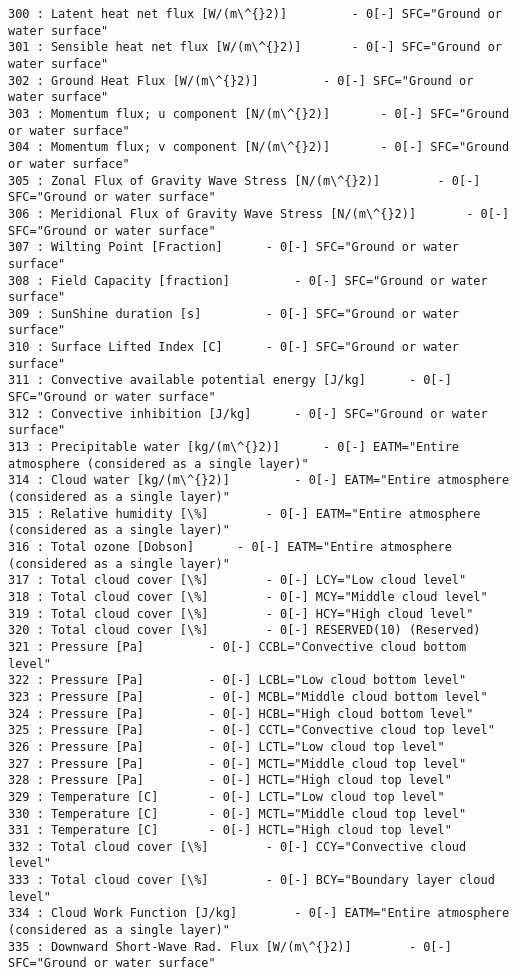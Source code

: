 \documentclass[11pt]{article}
\begin{document}
\begin{Verbatim}[commandchars=\\\{\}]
300 : Latent heat net flux [W/(m\^{}2)] 		- 0[-] SFC="Ground or water surface"
301 : Sensible heat net flux [W/(m\^{}2)] 		- 0[-] SFC="Ground or water surface"
302 : Ground Heat Flux [W/(m\^{}2)] 		- 0[-] SFC="Ground or water surface"
303 : Momentum flux; u component [N/(m\^{}2)] 		- 0[-] SFC="Ground or water surface"
304 : Momentum flux; v component [N/(m\^{}2)] 		- 0[-] SFC="Ground or water surface"
305 : Zonal Flux of Gravity Wave Stress [N/(m\^{}2)] 		- 0[-] SFC="Ground or water surface"
306 : Meridional Flux of Gravity Wave Stress [N/(m\^{}2)] 		- 0[-] SFC="Ground or water surface"
307 : Wilting Point [Fraction] 		- 0[-] SFC="Ground or water surface"
308 : Field Capacity [fraction] 		- 0[-] SFC="Ground or water surface"
309 : SunShine duration [s] 		- 0[-] SFC="Ground or water surface"
310 : Surface Lifted Index [C] 		- 0[-] SFC="Ground or water surface"
311 : Convective available potential energy [J/kg] 		- 0[-] SFC="Ground or water surface"
312 : Convective inhibition [J/kg] 		- 0[-] SFC="Ground or water surface"
313 : Precipitable water [kg/(m\^{}2)] 		- 0[-] EATM="Entire atmosphere (considered as a single layer)"
314 : Cloud water [kg/(m\^{}2)] 		- 0[-] EATM="Entire atmosphere (considered as a single layer)"
315 : Relative humidity [\%] 		- 0[-] EATM="Entire atmosphere (considered as a single layer)"
316 : Total ozone [Dobson] 		- 0[-] EATM="Entire atmosphere (considered as a single layer)"
317 : Total cloud cover [\%] 		- 0[-] LCY="Low cloud level"
318 : Total cloud cover [\%] 		- 0[-] MCY="Middle cloud level"
319 : Total cloud cover [\%] 		- 0[-] HCY="High cloud level"
320 : Total cloud cover [\%] 		- 0[-] RESERVED(10) (Reserved)
321 : Pressure [Pa] 		- 0[-] CCBL="Convective cloud bottom level"
322 : Pressure [Pa] 		- 0[-] LCBL="Low cloud bottom level"
323 : Pressure [Pa] 		- 0[-] MCBL="Middle cloud bottom level"
324 : Pressure [Pa] 		- 0[-] HCBL="High cloud bottom level"
325 : Pressure [Pa] 		- 0[-] CCTL="Convective cloud top level"
326 : Pressure [Pa] 		- 0[-] LCTL="Low cloud top level"
327 : Pressure [Pa] 		- 0[-] MCTL="Middle cloud top level"
328 : Pressure [Pa] 		- 0[-] HCTL="High cloud top level"
329 : Temperature [C] 		- 0[-] LCTL="Low cloud top level"
330 : Temperature [C] 		- 0[-] MCTL="Middle cloud top level"
331 : Temperature [C] 		- 0[-] HCTL="High cloud top level"
332 : Total cloud cover [\%] 		- 0[-] CCY="Convective cloud level"
333 : Total cloud cover [\%] 		- 0[-] BCY="Boundary layer cloud level"
334 : Cloud Work Function [J/kg] 		- 0[-] EATM="Entire atmosphere (considered as a single layer)"
335 : Downward Short-Wave Rad. Flux [W/(m\^{}2)] 		- 0[-] SFC="Ground or water surface"

\end{Verbatim}
\end{document}
